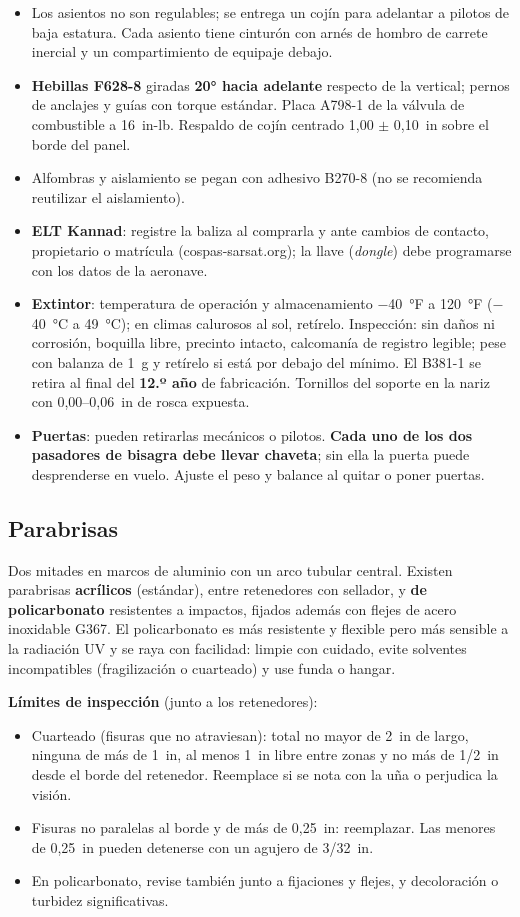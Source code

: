 \begin{itemize}
\item Los asientos no son regulables; se entrega un cojín para adelantar a pilotos de baja estatura. Cada asiento tiene cinturón con arnés de hombro de carrete inercial y un compartimiento de equipaje debajo.
\item \textbf{Hebillas F628-8} giradas \textbf{20° hacia adelante} respecto de la vertical; pernos de anclajes y guías con torque estándar. Placa A798-1 de la válvula de combustible a 16~in-lb. Respaldo de cojín centrado 1,00 $\pm$ 0,10~in sobre el borde del panel.
\item Alfombras y aislamiento se pegan con adhesivo B270-8 (no se recomienda reutilizar el aislamiento).
\item \textbf{ELT Kannad}: registre la baliza al comprarla y ante cambios de contacto, propietario o matrícula (cospas-sarsat.org); la llave (\emph{dongle}) debe programarse con los datos de la aeronave.
\item \textbf{Extintor}: temperatura de operación y almacenamiento $-$40~°F a 120~°F ($-$40~°C a 49~°C); en climas calurosos al sol, retírelo. Inspección: sin daños ni corrosión, boquilla libre, precinto intacto, calcomanía de registro legible; pese con balanza de 1~g y retírelo si está por debajo del mínimo. El B381-1 se retira al final del \textbf{12.º año} de fabricación. Tornillos del soporte en la nariz con 0,00--0,06~in de rosca expuesta.
\item \textbf{Puertas}: pueden retirarlas mecánicos o pilotos. \textbf{Cada uno de los dos pasadores de bisagra debe llevar chaveta}; sin ella la puerta puede desprenderse en vuelo. Ajuste el peso y balance al quitar o poner puertas.
\end{itemize}

\subsection{Parabrisas}

Dos mitades en marcos de aluminio con un arco tubular central. Existen parabrisas \textbf{acrílicos} (estándar), entre retenedores con sellador, y \textbf{de policarbonato} resistentes a impactos, fijados además con flejes de acero inoxidable G367. El policarbonato es más resistente y flexible pero más sensible a la radiación UV y se raya con facilidad: limpie con cuidado, evite solventes incompatibles (fragilización o cuarteado) y use funda o hangar.

\textbf{Límites de inspección} (junto a los retenedores):
\begin{itemize}
\item Cuarteado (fisuras que no atraviesan): total no mayor de 2~in de largo, ninguna de más de 1~in, al menos 1~in libre entre zonas y no más de 1/2~in desde el borde del retenedor. Reemplace si se nota con la uña o perjudica la visión.
\item Fisuras no paralelas al borde y de más de 0,25~in: reemplazar. Las menores de 0,25~in pueden detenerse con un agujero de 3/32~in.
\item En policarbonato, revise también junto a fijaciones y flejes, y decoloración o turbidez significativas.
\end{itemize}


